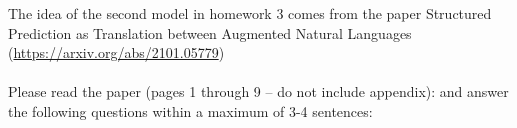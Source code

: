 The idea of the second model in homework 3 comes from the paper
Structured Prediction as Translation between Augmented Natural Languages (\url{https://arxiv.org/abs/2101.05779})\\\\
Please read the paper (pages 1 through 9 -- do not include appendix): and answer the following questions within a maximum of 3-4 sentences: